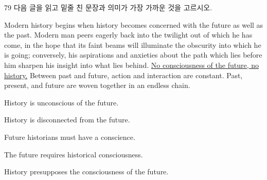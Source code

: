 \begin{question}{79}
다음 글을 읽고 밑줄 친 문장과 의미가 가장 가까운 것을 고르시오.
\begin{framedtext}
Modern history begins when history becomes concerned with the future as well as the past. Modern man peers eagerly back into the twilight out of which he has come, in the hope that its faint beams will illuminate the obscurity into which he is going; conversely, his aspirations and anxieties about the path which lies before him sharpen his insight into what lies behind. \uline{No consciousness of the future, no history.} Between past and future, action and interaction are constant. Past, present, and future are woven together in an endless chain.
\end{framedtext}
\begin{choices}
  \item History is unconscious of the future.
  \item History is disconnected from the future.
  \item Future historians must have a conscience.
  \item The future requires historical consciousness.
  \item History presupposes the consciousness of the future.
\end{choices}
\end{question}
